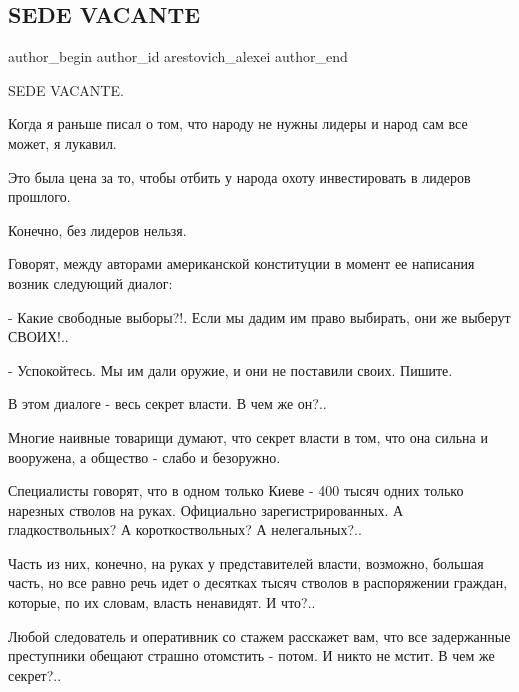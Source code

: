 
 
 
 
 
 
\subsection{SEDE VACANTE}
\label{sec:30_12_2013.fb.arestovich_alexei.1.sede_vacante}
 
\ifcmt
 author_begin
   author_id arestovich_alexei
 author_end
\fi

SEDE VACANTE.

Когда я раньше писал о том, что народу не нужны лидеры и народ сам все может, я
лукавил.

Это была цена за то, чтобы отбить у народа охоту инвестировать в лидеров
прошлого. 

Конечно, без лидеров нельзя. 

Говорят, между авторами американской конституции в момент ее написания возник
следующий диалог:

- Какие свободные выборы?!. Если мы дадим им право выбирать, они же выберут
СВОИХ!..

 - Успокойтесь. Мы им дали оружие, и они не поставили своих. Пишите. 

В этом диалоге - весь секрет власти. В чем же он?..

Многие наивные товарищи думают, что секрет власти в том, что она сильна и
вооружена, а общество - слабо и безоружно. 

Специалисты говорят, что в одном только Киеве - 400 тысяч одних только нарезных
стволов на руках. Официально зарегистрированных. А гладкоствольных? А
короткоствольных? А нелегальных?.. 

Часть из них, конечно, на руках у представителей власти, возможно, большая
часть, но все равно речь идет о десятках тысяч стволов в распоряжении граждан,
которые, по их словам, власть ненавидят. И что?..

Любой следователь и оперативник со стажем расскажет вам, что все задержанные
преступники обещают страшно отомстить - потом. И никто не мстит. В чем же
секрет?..

